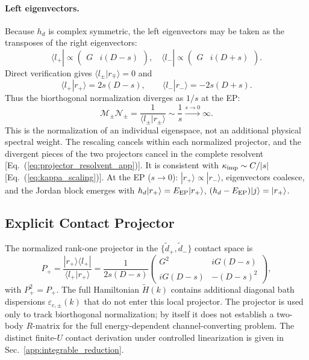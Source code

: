 \documentclass[%
  aps,prb,reprint,amsmath,amssymb,superscriptaddress,longbibliography,floatfix
]{revtex4-2}
\newcommand{\Htilde}{\tilde{H}}
\newcommand{\keff}{\kappa_{\rm imp}}
\begin{document}
\paragraph{Left eigenvectors.}
Because $h_d$ is complex symmetric, the left eigenvectors may be taken
as the transposes of the right eigenvectors:
\begin{equation}
\langle l_+|\propto\begin{pmatrix}G & i(D-s)\end{pmatrix},\quad
\langle l_-|\propto\begin{pmatrix}G & i(D+s)\end{pmatrix}.
\label{eq:left_evecs}
\end{equation}
Direct verification gives $\langle l_\pm|r_\mp\rangle=0$ and
\begin{equation}
\langle l_+|r_+\rangle=2s(D-s),\qquad
\langle l_-|r_-\rangle=-2s(D+s).
\end{equation}
Thus the biorthogonal normalization diverges as $1/s$ at the EP:
\begin{equation}
\mathcal{M}_\pm\mathcal{N}_\pm
=\frac{1}{\langle l_\pm|r_\pm\rangle}
\sim \frac{1}{s}\xrightarrow{s\to0}\infty.
\label{eq:biorth_norm}
\end{equation}
This is the normalization of an individual eigenspace, not an additional
physical spectral weight.  The rescaling cancels within each normalized
projector, and the divergent pieces of the two projectors cancel in the
complete resolvent [Eq.~(\ref{eq:projector_resolvent_app})].  It is
consistent with $\keff\sim C/|s|$ [Eq.~(\ref{eq:kappa_scaling})].
At the EP ($s\to0$): $|r_+\rangle\propto|r_-\rangle$,
eigenvectors coalesce, and the Jordan block emerges with
$h_d|r_+\rangle=E_{\rm EP}|r_+\rangle$,
$(h_d-E_{\rm EP})|j\rangle=|r_+\rangle$.

\subsection{Explicit Contact Projector}

The normalized rank-one projector in the $\{\tilde d_+,\tilde d_-\}$
contact space is
\begin{equation}
P_+=\frac{|r_+\rangle\langle l_+|}{\langle l_+|r_+\rangle}
=\frac{1}{2s(D-s)}
\begin{pmatrix}
G^2 & iG(D-s)\\
iG(D-s) & -(D-s)^2
\end{pmatrix},
\label{eq:Pplus_contact}
\end{equation}
with $P_+^2=P_+$.
The full Hamiltonian $\Htilde(k)$ contains additional diagonal bath
dispersions $\varepsilon_{c,\pm}(k)$ that do not enter this local
projector.  The projector is used only to track biorthogonal normalization;
by itself it does not establish a two-body $R$-matrix for the full
energy-dependent channel-converting problem.  The distinct finite-\(U\)
contact derivation under controlled linearization is given in
Sec.~\ref{app:integrable_reduction}.
\end{document}
